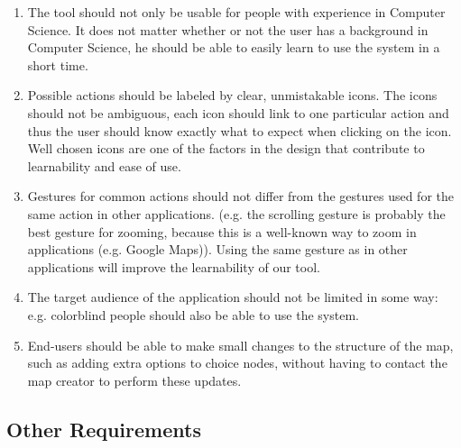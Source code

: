 \begin{enumerate}[label=\textbf{UR \arabic*}., ref=UR \arabic*, labelindent=0.5cm, leftmargin=*]

	\item \label{ur:intuitiveness}
		The tool should not only be usable for people with experience in Computer Science. It does not matter whether or not the user has a background in Computer Science, he should be able to easily learn to use the system in a short time.
	
	\item \label{ur:icons}
		Possible actions should be labeled by clear, unmistakable icons. The icons should not be ambiguous, each icon should link to one particular action and thus the user should know exactly what to expect when clicking on the icon. Well chosen icons are one of the factors in the design that contribute to learnability and ease of use.
	
	\item \label{ur:gestures}
		Gestures for common actions should not differ from the gestures used for the same action in other applications. (e.g. the scrolling gesture is probably the best gesture for zooming, because this is a well-known way to zoom in applications (e.g. Google Maps)). Using the same gesture as in other applications will improve the learnability of our tool.
	
	\item \label{ur:accessibility}
		The target audience of the application should not be limited in some way: e.g. colorblind people should also be able to use the system.
	
	\item \label{ur:time}
		End-users should be able to make small changes to the structure of the map, such as adding extra options to choice nodes, without having to contact the map creator to perform these updates.
	
\end{enumerate}



\subsection{Other Requirements}\label{sec:other-requirements}

